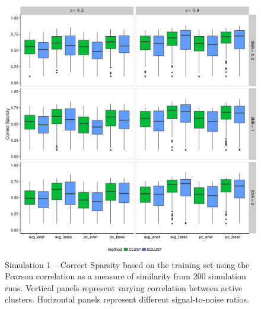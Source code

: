\begin{appendices}
\begin{figure}[H]
	\centering
	\includegraphics[scale=0.6, keepaspectratio]{./figs/hydra/results/figures/sim1-sept10/CorrectSparsity_Correlation_sim1.png}
	\caption{Simulation 1 -- Correct Sparsity based on the training set using the Pearson correlation as a measure of similarity from 200 simulation runs. Vertical panels represent varying correlation between active clusters. Horizontal panels represent different signal-to-noise ratios.}
	\label{fig:CorrectSparsity_Correlation_sim1}
\end{figure}



\end{appendices}

